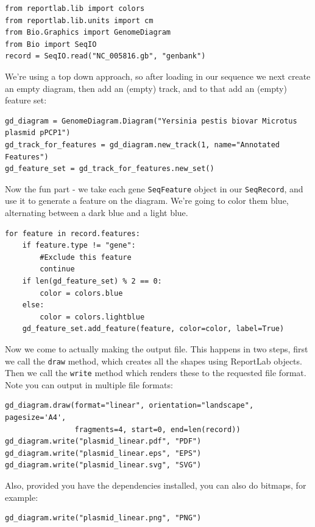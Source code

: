 \documentclass{report}
\begin{document}
\begin{verbatim}
from reportlab.lib import colors
from reportlab.lib.units import cm
from Bio.Graphics import GenomeDiagram
from Bio import SeqIO
record = SeqIO.read("NC_005816.gb", "genbank")
\end{verbatim}

We're using a top down approach, so after loading in our sequence we next
create an empty diagram, then add an (empty) track, and to that add an
(empty) feature set:

\begin{verbatim}
gd_diagram = GenomeDiagram.Diagram("Yersinia pestis biovar Microtus plasmid pPCP1")
gd_track_for_features = gd_diagram.new_track(1, name="Annotated Features")
gd_feature_set = gd_track_for_features.new_set()
\end{verbatim}

Now the fun part - we take each gene \verb|SeqFeature| object in our
\verb|SeqRecord|, and use it to generate a feature on the diagram. We're
going to color them blue, alternating between a dark blue and a light blue.
\begin{verbatim}
for feature in record.features:
    if feature.type != "gene":
        #Exclude this feature
        continue
    if len(gd_feature_set) % 2 == 0:
        color = colors.blue
    else:
        color = colors.lightblue
    gd_feature_set.add_feature(feature, color=color, label=True)
\end{verbatim}

Now we come to actually making the output file.  This happens in two steps,
first we call the \verb|draw| method, which creates all the shapes using
ReportLab objects.  Then we call the \verb|write| method which renders these
to the requested file format.  Note you can output in multiple file formats:

\begin{verbatim}
gd_diagram.draw(format="linear", orientation="landscape", pagesize='A4',
                fragments=4, start=0, end=len(record))
gd_diagram.write("plasmid_linear.pdf", "PDF")
gd_diagram.write("plasmid_linear.eps", "EPS")
gd_diagram.write("plasmid_linear.svg", "SVG")
\end{verbatim}

Also, provided you have the dependencies installed, you can also do bitmaps,
for example:

\begin{verbatim}
gd_diagram.write("plasmid_linear.png", "PNG")
\end{verbatim}
\end{document}
